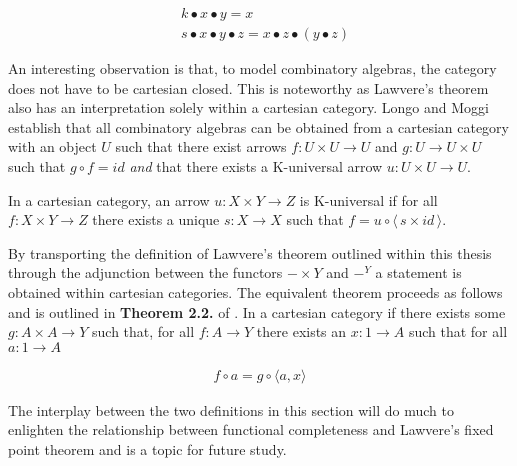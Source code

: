 \begin{align*}
    &k \bullet x \bullet y = x \\
    & s \bullet x \bullet y \bullet z = x \bullet z \bullet (y \bullet z)
\end{align*}

An interesting observation is that, to model combinatory algebras, the category
does not have to be cartesian closed.  This is noteworthy as Lawvere's theorem
also has an interpretation solely within a cartesian category. Longo and Moggi
establish that all combinatory algebras can be obtained from a cartesian
category with an object $U$ such that there exist arrows $f : U \times U
\rightarrow U$ and $g : U \rightarrow U \times U$ such that $g \circ f = id$
\textit{and} that there exists a K-universal arrow $u :U \times U
\rightarrow U$.

In a cartesian category, an arrow $u : X \times Y \rightarrow Z$ is K-universal
if for all $f : X \times Y \rightarrow Z$ there exists a unique $s : X
\rightarrow X$ such that $f = u \circ \langle \, s \times id \, \rangle$.

By transporting the definition of Lawvere's theorem outlined within this thesis
through the adjunction between the functors $-\times Y$ and $-^{Y}$ a statement
is obtained within cartesian categories. The equivalent theorem proceeds as
follows and is outlined in \textbf{Theorem 2.2.} of \cite{lawvere1969diagonal}.
In a cartesian category if there exists some $g : A \times A \rightarrow Y$ such
that, for all $f : A \rightarrow Y$ there exists an $x : 1 \rightarrow A$ such
that for all $a : 1 \rightarrow A$

\begin{align*}
    f \circ a = g \circ \langle a , x \rangle
\end{align*}

The interplay between the two definitions in this section will do much to
enlighten the relationship between functional completeness and Lawvere's fixed
point theorem and is a topic for future study.
